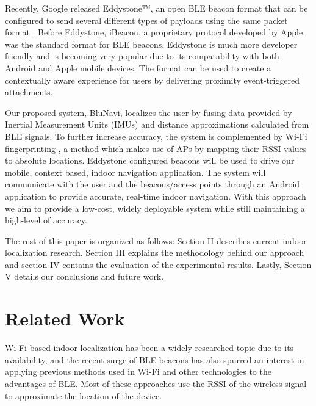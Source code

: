 \documentclass[conference]{IEEEtran}
\begin{document}
Recently, Google released Eddystone™, an open BLE beacon format that can be configured to send several different types of payloads using the same packet format \cite{developers.google.com}. Before Eddystone, iBeacon, a proprietary protocol developed by Apple, was the standard format for BLE beacons. Eddystone is much more developer friendly and is becoming very popular due to its compatability with both Android and Apple mobile devices. The format can be used to create a contextually aware experience for users by delivering proximity event-triggered attachments.

Our proposed system, BluNavi, localizes the user by fusing data provided by Inertial Measurement Units (IMUs) and distance approximations calculated from BLE signals. To further increase accuracy, the system is complemented by Wi-Fi fingerprinting , a method which makes use of APs by mapping their RSSI values to absolute locations. Eddystone configured beacons will be used to drive our mobile, context based, indoor navigation application. The system will communicate with the user and the beacons/access points through an Android application to provide accurate, real-time indoor navigation. With this approach we aim to provide a low-cost, widely deployable system while still maintaining  a high-level of accuracy.

The rest of this paper is organized as follows: Section II describes current indoor localization research. Section III explains the methodology behind our approach and section IV contains the evaluation of the experimental results. Lastly, Section V details our conclusions and future work.

\section{Related Work}
Wi-Fi based indoor localization has been a widely researched topic due to its availability, and the recent surge of BLE beacons has also spurred an interest in applying previous methods used in Wi-Fi and other technologies to the advantages of BLE. Most of these approaches use the RSSI of the wireless signal to approximate the location of the device.
\end{document}
